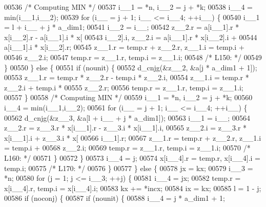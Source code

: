 \begin{DoxyCode}
00536 \textcolor{comment}{/* Computing MIN */}
00537             i\_\_1 = *n, i\_\_2 = j + *k;
00538             i\_\_4 = min(i\_\_1,i\_\_2);
00539             \textcolor{keywordflow}{for} (i\_\_ = j + 1; i\_\_ <= i\_\_4; ++i\_\_) \{
00540                 i\_\_1 = l + i\_\_ + j * a\_dim1;
00541                 i\_\_2 = i\_\_;
00542                 z\_\_2.r = a[i\_\_1].r * x[i\_\_2].r - a[i\_\_1].i * x[
00543                     i\_\_2].i, z\_\_2.i = a[i\_\_1].r * x[i\_\_2].i + 
00544                     a[i\_\_1].i * x[i\_\_2].r;
00545                 z\_\_1.r = temp.r + z\_\_2.r, z\_\_1.i = temp.i + 
00546                     z\_\_2.i;
00547                 temp.r = z\_\_1.r, temp.i = z\_\_1.i;
00548 \textcolor{comment}{/* L150: */}
00549             \}
00550             \} \textcolor{keywordflow}{else} \{
00551             \textcolor{keywordflow}{if} (nounit) \{
00552                 d\_cnjg(&z\_\_2, &a[j * a\_dim1 + 1]);
00553                 z\_\_1.r = temp.r * z\_\_2.r - temp.i * z\_\_2.i, 
00554                     z\_\_1.i = temp.r * z\_\_2.i + temp.i * 
00555                     z\_\_2.r;
00556                 temp.r = z\_\_1.r, temp.i = z\_\_1.i;
00557             \}
00558 \textcolor{comment}{/* Computing MIN */}
00559             i\_\_1 = *n, i\_\_2 = j + *k;
00560             i\_\_4 = min(i\_\_1,i\_\_2);
00561             \textcolor{keywordflow}{for} (i\_\_ = j + 1; i\_\_ <= i\_\_4; ++i\_\_) \{
00562                 d\_cnjg(&z\_\_3, &a[l + i\_\_ + j * a\_dim1]);
00563                 i\_\_1 = i\_\_;
00564                 z\_\_2.r = z\_\_3.r * x[i\_\_1].r - z\_\_3.i * x[i\_\_1].i, 
00565                     z\_\_2.i = z\_\_3.r * x[i\_\_1].i + z\_\_3.i * x[
00566                     i\_\_1].r;
00567                 z\_\_1.r = temp.r + z\_\_2.r, z\_\_1.i = temp.i + 
00568                     z\_\_2.i;
00569                 temp.r = z\_\_1.r, temp.i = z\_\_1.i;
00570 \textcolor{comment}{/* L160: */}
00571             \}
00572             \}
00573             i\_\_4 = j;
00574             x[i\_\_4].r = temp.r, x[i\_\_4].i = temp.i;
00575 \textcolor{comment}{/* L170: */}
00576         \}
00577         \} \textcolor{keywordflow}{else} \{
00578         jx = kx;
00579         i\_\_3 = *n;
00580         \textcolor{keywordflow}{for} (j = 1; j <= i\_\_3; ++j) \{
00581             i\_\_4 = jx;
00582             temp.r = x[i\_\_4].r, temp.i = x[i\_\_4].i;
00583             kx += *incx;
00584             ix = kx;
00585             l = 1 - j;
00586             \textcolor{keywordflow}{if} (noconj) \{
00587             \textcolor{keywordflow}{if} (nounit) \{
00588                 i\_\_4 = j * a\_dim1 + 1;

\end{DoxyCode}
